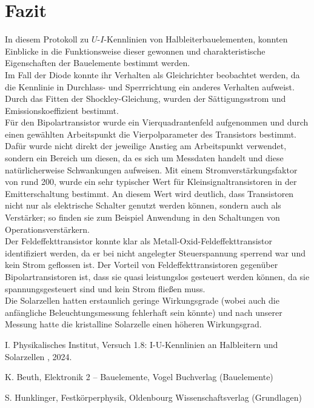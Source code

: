 \documentclass[12pt,a4paper,ngerman]{report}
\begin{document}
\chapter{Fazit}
In diesem Protokoll zu $U$-$I$-Kennlinien von Halbleiterbauelementen, konnten Einblicke in die Funktionsweise dieser gewonnen und charakteristische Eigenschaften der Bauelemente bestimmt werden.\\
Im Fall der Diode konnte ihr Verhalten als Gleichrichter beobachtet werden, da die Kennlinie in Durchlass- und Sperrrichtung ein anderes Verhalten aufweist. Durch das Fitten der Shockley-Gleichung, wurden der Sättigungsstrom und Emissionskoeffizient bestimmt.\\
Für den Bipolartransistor wurde ein Vierquadrantenfeld aufgenommen und durch einen gewählten Arbeitspunkt die Vierpolparameter des Transistors bestimmt. Dafür wurde nicht direkt der jeweilige Anstieg am Arbeitspunkt verwendet, sondern ein Bereich um diesen, da es sich um Messdaten handelt und diese natürlicherweise Schwankungen aufweisen. Mit einem Stromverstärkungsfaktor von rund 200, wurde ein sehr typischer Wert für Kleinsignaltransistoren in der Emitterschaltung bestimmt. An diesem Wert wird deutlich, dass Transistoren nicht nur als elektrische Schalter genutzt werden können, sondern auch als Verstärker; so finden sie zum Beispiel Anwendung in den Schaltungen von Operationsverstärkern.\\
Der Feldeffekttransistor konnte klar als  Metall-Oxid-Feldeffekttransistor identifiziert werden, da er bei nicht angelegter Steuerspannung sperrend war und kein Strom geflossen ist. Der Vorteil von Feldeffekttransistoren gegenüber Bipolartransistoren ist, dass sie quasi leistungslos gesteuert werden können, da sie spannungsgesteuert sind und kein Strom fließen muss.\\
Die Solarzellen hatten erstaunlich geringe Wirkungsgrade (wobei auch die anfängliche Beleuchtungsmessung fehlerhaft sein könnte) und nach unserer Messung hatte die kristalline Solarzelle einen höheren Wirkungsgrad.



	\listoffigures
	
	\begin{thebibliography}{111} 
		I. Physikalisches Institut, \glqq Versuch 1.8: I-U-Kennlinien an Halbleitern
		und Solarzellen \grqq{}, 2024.
		
		K. Beuth, \glqq Elektronik 2 – Bauelemente\grqq, Vogel Buchverlag (Bauelemente)
		
		S. Hunklinger, \glqq Festkörperphysik\grqq, Oldenbourg Wissenschaftsverlag (Grundlagen)
		
		
		
	\end{thebibliography}


\end{document}
